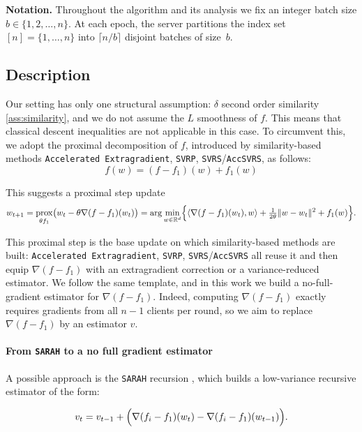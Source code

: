 \documentclass{article}
\DeclareMathOperator{\prox}{prox}
\begin{document}
\textbf{Notation.} Throughout the algorithm and its analysis
we fix an integer batch size $b \in \{1, 2, \ldots, n\}$.
At each epoch, the server partitions the index set
$[n] = \{1, \ldots, n\}$ into $\lceil n/b \rceil$ disjoint batches
of size~$b$.

\subsection{Description} \label{algorithm}

Our setting has only one structural assumption: $\delta$ second order similarity \ref{ass:similarity}, and we do not assume the $L$ smoothness of $f$. This means that classical descent inequalities are not applicable in this case. To circumvent this, we adopt the proximal decomposition of $f$, introduced by similarity-based methods \texttt{Accelerated Extragradient}, \texttt{SVRP}, \texttt{SVRS}/\texttt{AccSVRS}, as follows: 
\[
     f(w) = (f - f_1)(w) + f_1(w)
\]

This suggests a proximal step update 
\begin{equation*}
\label{eq:ideal_update}
    w_{t+1} = \prox_{\theta f_1}\bigl(w_t - \theta \nabla(f - f_1)(w_t)\bigr)
    = \arg\min_{w \in \mathbb{R}^d} \Bigl\{\langle \nabla(f - f_1)(w_t), w \rangle 
    + \tfrac{1}{2\theta}\|w - w_t\|^2 + f_1(w)\Bigr\}.
\end{equation*}

This proximal step is the base update on which similarity-based methods are built: \texttt{Accelerated Extragradient}, \texttt{SVRP}, \texttt{SVRS}/\texttt{AccSVRS} all reuse it and then equip $\nabla(f - f_1)$ with an extragradient correction or a variance-reduced estimator. We follow the same template, and in this work we build a no-full-gradient estimator for $\nabla(f - f_1)$. Indeed, computing $\nabla(f-f_1)$ exactly requires gradients from all $n-1$ clients per round, so we aim to replace $\nabla (f - f_1)$ by an estimator $v$. 

\paragraph{From \texttt{SARAH} to a no full gradient estimator}
A possible approach is the \texttt{SARAH} recursion \cite{nguyen2017sarah}, which builds a low-variance recursive estimator of the form: 

\begin{equation}
\label{eq:sarah_recursion}
    v_t = v_{t-1} + \Bigl(
    \nabla(f_i - f_1)(w_t) - \nabla(f_i - f_1)(w_{t-1})\Bigr).
\end{equation}
\end{document}

